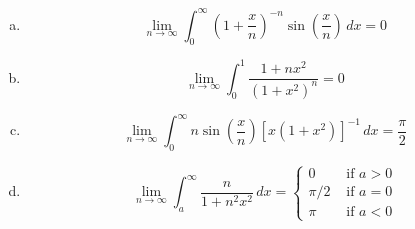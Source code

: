 \documentclass{article}
\begin{document}
\begin{enumerate}[(a)]
\item $$\lim_{n\to \infty} \int_0^\infty \left( 1 + \frac x n \right)^{-n} \sin \left(\frac x n \right) \, dx = 0$$
\item $$\lim_{n \to \infty} \int_0^1 \frac{1 + n x^2} {(1 + x^2)^n} = 0$$
\item $$\lim_{n \to \infty} \int_0^\infty n \sin \left( \frac x n \right) [x(1+x^2)]^{-1} \, dx = \frac \pi 2$$
\item $$\lim_{n \to \infty} \int_a^\infty \frac n {1 + n^2 x^2} \, dx= \left\{ 
\begin{array}{ll}
   0 & \text{ if } a > 0
\\ \pi/2 & \text{ if } a = 0
\\ \pi  & \text{ if } a < 0
\end{array} \right.
$$
\end{enumerate}
\end{document}
